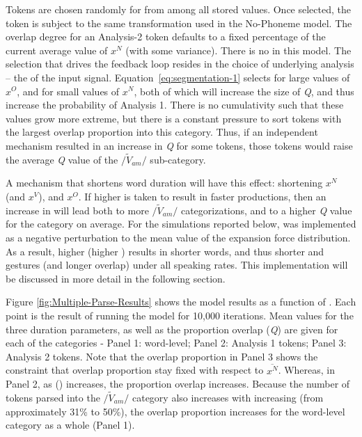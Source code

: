 Tokens are chosen randomly for  from among all stored values.
Once selected, the token is subject to the same  transformation
used in the No-Phoneme model. The overlap degree for an Analysis-2
token defaults to a fixed percentage of the current average value
of $x^{N}$ (with some variance). There is no   in this
model. The selection  that drives the feedback loop resides in
the choice of underlying analysis – the  of the input signal.
Equation~\ref{eq:segmentation-1} selects for large values of $x^{O}$,
and for small values of $x^{N}$, both of which will increase the
size of \emph{Q}, and thus increase the probability of Analysis 1.
There is no cumulativity such that these values grow more extreme,
but there is a constant pressure to sort tokens with the largest overlap
proportion into this  category. Thus, if an independent
mechanism resulted in an increase in \emph{Q} for some tokens, those
tokens would raise the average \emph{Q} value of the $/\tilde{V}_{am}/$
sub-category.

A mechanism that shortens word duration will have this effect: shortening
$x^{N}$ (and $x^{V}$), and  $x^{O}$. If higher 
is taken to result in faster productions, then an increase in 
will lead both to more $/\tilde{V}_{am}/$ categorizations, and to a higher \emph{Q} value for the category on average. For the simulations
reported below,  was implemented as a negative perturbation
to the mean value of the expansion force distribution. As a result,
higher  (higher ) results in shorter words,
and thus shorter  and  gestures (and longer overlap)
under all speaking rates. This implementation will be discussed in
more detail in the following section. 

Figure \ref{fig:Multiple-Parse-Results} shows the model results as
a function of . Each point is the result of running the model
for 10,000 iterations. Mean values for the three duration parameters,
as well as the proportion overlap (\emph{Q}) are given for each of
the categories - Panel 1: word-level; Panel 2: Analysis 1 tokens; Panel
3: Analysis 2 tokens. Note that the overlap proportion in Panel 3
shows the constraint that overlap proportion stay fixed with respect
to $\overline{x^{N}}$. Whereas, in Panel 2, as 
() increases, the proportion overlap increases. Because the
number of tokens parsed into the $/\tilde{V}_{am}/$ category also
increases with increasing  (from approximately 31\%
to 50\%), the overlap proportion increases for the word-level category
as a whole (Panel 1). 

